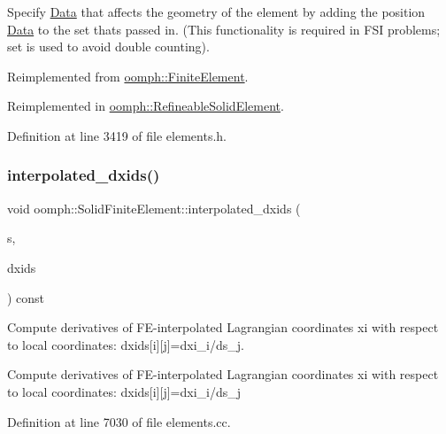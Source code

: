 Specify \hyperlink{classoomph_1_1Data}{Data} that affects the geometry of the element by adding the position \hyperlink{classoomph_1_1Data}{Data} to the set that\textquotesingle{}s passed in. (This functionality is required in F\+SI problems; set is used to avoid double counting). 



Reimplemented from \hyperlink{classoomph_1_1FiniteElement_af60133cebd1961567b1160782467ad58}{oomph\+::\+Finite\+Element}.



Reimplemented in \hyperlink{classoomph_1_1RefineableSolidElement_a48623914f87556be55fb97cf68f0ee93}{oomph\+::\+Refineable\+Solid\+Element}.



Definition at line 3419 of file elements.\+h.

\mbox{\label{classoomph_1_1SolidFiniteElement_a9af4491d7ce7475d25e3fa27c2c29654}} 
\subsubsection{\texorpdfstring{interpolated\+\_\+dxids()}{interpolated\_dxids()}}
{\footnotesize\ttfamily void oomph\+::\+Solid\+Finite\+Element\+::interpolated\+\_\+dxids (\begin{DoxyParamCaption}\item[{const \hyperlink{classoomph_1_1Vector}{Vector}$<$ double $>$ \&}]{s,  }\item[{\hyperlink{classoomph_1_1DenseMatrix}{Dense\+Matrix}$<$ double $>$ \&}]{dxids }\end{DoxyParamCaption}) const\hspace{0.3cm}{\ttfamily [virtual]}}



Compute derivatives of F\+E-\/interpolated Lagrangian coordinates xi with respect to local coordinates\+: dxids\mbox{[}i\mbox{]}\mbox{[}j\mbox{]}=dxi\+\_\+i/ds\+\_\+j. 

Compute derivatives of F\+E-\/interpolated Lagrangian coordinates xi with respect to local coordinates\+: dxids\mbox{[}i\mbox{]}\mbox{[}j\mbox{]}=dxi\+\_\+i/ds\+\_\+j 

Definition at line 7030 of file elements.\+cc.



